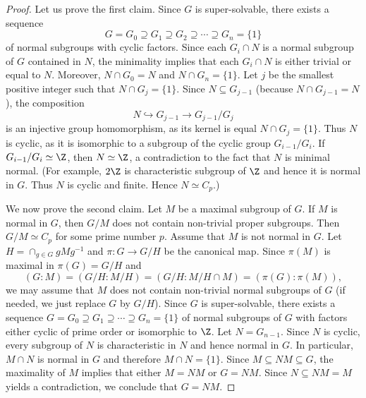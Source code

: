 \begin{proof}
Let us prove the first claim. Since $G$ is super-solvable, there exists a sequence 
\[
G=G_0\supseteq G_1\supseteq
G_2\supseteq\cdots\supseteq G_n=\{1\}
\]
of normal subgroups with cyclic factors. Since 
each $G_i\cap N$ is a normal subgroup of $G$ contained in $N$, 
the minimality implies that 
each $G_i\cap N$ is either trivial or equal to $N$. Moreover, $N\cap G_0=N$ and $N\cap
G_n=\{1\}$. Let $j$ be the smallest positive integer such that $N\cap G_j=\{1\}$. 
Since $N\subseteq G_{j-1}$ (because $N\cap G_{j-1}=N$), the composition 
	\[
	N\hookrightarrow G_{j-1}\to G_{j-1}/G_j
	\]
is an injective group homomorphism, as its kernel is equal $N\cap G_{j}=\{1\}$. 
Thus $N$ is cyclic, as it is isomorphic to a subgroup of the cyclic group $G_{i-1}/G_i$. 
If $G_{i-1}/G_i\simeq\Z$, then $N\simeq\Z$, a contradiction to the fact that $N$ is minimal normal. (For example, 
$2\Z$ is characteristic subgroup of $\Z$ and hence it is normal in $G$. Thus $N$ is cyclic and finite. Hence $N\simeq C_p$.)

We now prove the second claim. Let $M$ be a maximal subgroup of $G$. If $M$ is normal in $G$, 
then $G/M$ does not contain non-trivial proper subgroups. Then 
$G/M\simeq C_p$ for some prime number $p$. Assume that $M$ is not normal in $G$. 
Let $H=\cap_{g\in G}gMg^{-1}$ and $\pi\colon G\to G/H$ be the canonical map.  
Since $\pi(M)$ is maximal in 
	$\pi(G)=G/H$ and 
	\[
		(G:M)=(G/H:M/H)=(G/H:M/H\cap M)=(\pi(G):\pi(M)),
	\]
we may assume that $M$ does not contain non-trivial normal subgroups of $G$ (if needed, 
we just replace $G$ by $G/H$). Since $G$ is super-solvable, there exists a sequence 
$G=G_0\supseteq G_1\supseteq\cdots\supseteq G_n=\{1\}$ of normal subgroups of $G$ 
with factors either cyclic of prime order or isomorphic to $\Z$. Let 
$N=G_{n-1}$. Since $N$ is cyclic, every subgroup of $N$ is characteristic 
in $N$ and hence normal in $G$. In particular, $M\cap N$ is normal in 
$G$ and therefore $M\cap N=\{1\}$. Since $M\subseteq
NM\subseteq G$, the maximality of $M$ implies that either $M=NM$ or $G=NM$.
Since $N\subseteq NM=M$ yields a contradiction, we conclude that $G=NM$.


\end{proof}
